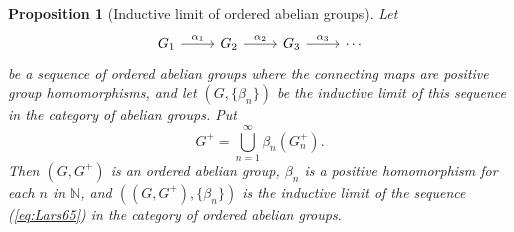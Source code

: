 \documentclass{book}
\newtheorem{proposition}[definition]{Proposition}
\begin{document}
\begin{proposition}[Inductive limit of ordered abelian groups]\label{prop:Lars626}
  Let
  \begin{equation}\label{eq:Lars65}
    \begin{tikzcd}
      G_1\arrow[r,"\alpha_1"]&G_2\arrow[r,"\alpha_2"]&G_3\arrow[r,"\alpha_3"]&\cdots
    \end{tikzcd}
  \end{equation}
  be a sequence of ordered abelian groups where the connecting maps are positive
  group homomorphisms, and let \((G,\{\beta_n\})\) be the inductive limit of this sequence in the category of 
  abelian groups. Put 
  \[
    G^+=\bigcup_{n=1}^\infty\beta_n(G_n^+).
  \]
  Then \((G,G^+)\) is an ordered abelian group, \(\beta_n\) is a positive homomorphism
  for each \(n\) in \(\mathbb{N}\), and \(((G,G^+),\{\beta_n\})\) is the inductive limit of the 
  sequence (\ref{eq:Lars65}) in the category of ordered abelian groups.
\end{proposition}
\end{document}
